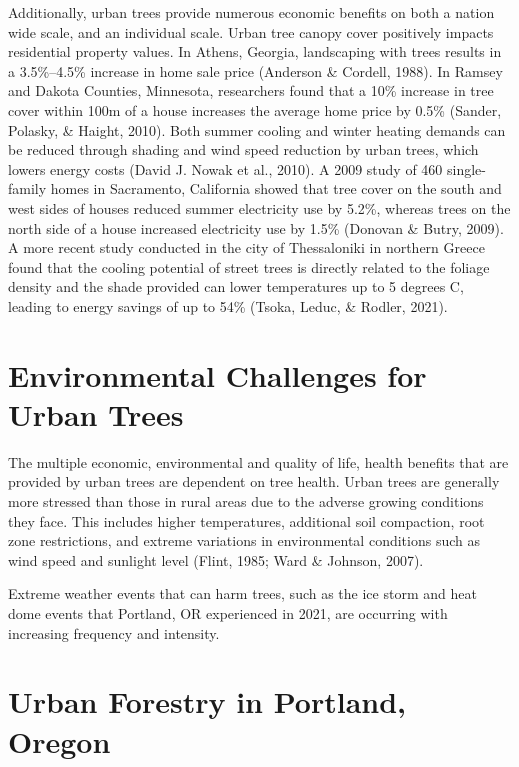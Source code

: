 \documentclass[12pt,twoside]{reedthesis}
\begin{document}
Additionally, urban trees provide numerous economic benefits on both a nation wide scale, and an individual scale. Urban tree canopy cover positively impacts residential property values. In Athens, Georgia, landscaping with trees results in a 3.5\%--4.5\% increase in home sale price (Anderson \& Cordell, 1988). In Ramsey and Dakota Counties, Minnesota, researchers found that a 10\% increase in tree cover within 100m of a house increases the average home price by 0.5\% (Sander, Polasky, \& Haight, 2010). Both summer cooling and winter heating demands can be reduced through shading and wind speed reduction by urban trees, which lowers energy costs (David J. Nowak et al., 2010). A 2009 study of 460 single-family homes in Sacramento, California showed that tree cover on the south and west sides of houses reduced summer electricity use by 5.2\%, whereas trees on the north side of a house increased electricity use by 1.5\% (Donovan \& Butry, 2009). A more recent study conducted in the city of Thessaloniki in northern Greece found that the cooling potential of street trees is directly related to the foliage density and the shade provided can lower temperatures up to 5 degrees C, leading to energy savings of up to 54\% (Tsoka, Leduc, \& Rodler, 2021).

\hypertarget{environmental-challenges-for-urban-trees}{%
\section{Environmental Challenges for Urban Trees}\label{environmental-challenges-for-urban-trees}}

The multiple economic, environmental and quality of life, health benefits that are provided by urban trees are dependent on tree health. Urban trees are generally more stressed than those in rural areas due to the adverse growing conditions they face. This includes higher temperatures, additional soil compaction, root zone restrictions, and extreme variations in environmental conditions such as wind speed and sunlight level (Flint, 1985; Ward \& Johnson, 2007).

Extreme weather events that can harm trees, such as the ice storm and heat dome events that Portland, OR experienced in 2021, are occurring with increasing frequency and intensity.

\hypertarget{urban-forestry-in-portland-oregon}{%
\section{Urban Forestry in Portland, Oregon}\label{urban-forestry-in-portland-oregon}}
\end{document}
